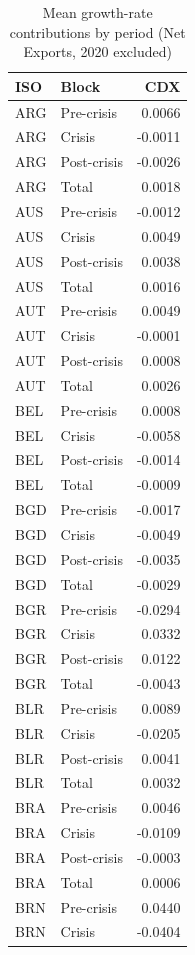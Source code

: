 
\begin{longtable}[t]{llr}
\caption{\label{tab:TAB-PERIOD-MEANS}Mean growth-rate contributions by period (Net Exports, 2020 excluded)}\\
\toprule
ISO & Block & CDX\\
\midrule
ARG & Pre-crisis & 0.0066\\
ARG & Crisis & -0.0011\\
ARG & Post-crisis & -0.0026\\
ARG & Total & 0.0018\\
AUS & Pre-crisis & -0.0012\\
\addlinespace
AUS & Crisis & 0.0049\\
AUS & Post-crisis & 0.0038\\
AUS & Total & 0.0016\\
AUT & Pre-crisis & 0.0049\\
AUT & Crisis & -0.0001\\
\addlinespace
AUT & Post-crisis & 0.0008\\
AUT & Total & 0.0026\\
BEL & Pre-crisis & 0.0008\\
BEL & Crisis & -0.0058\\
BEL & Post-crisis & -0.0014\\
\addlinespace
BEL & Total & -0.0009\\
BGD & Pre-crisis & -0.0017\\
BGD & Crisis & -0.0049\\
BGD & Post-crisis & -0.0035\\
BGD & Total & -0.0029\\
\addlinespace
BGR & Pre-crisis & -0.0294\\
BGR & Crisis & 0.0332\\
BGR & Post-crisis & 0.0122\\
BGR & Total & -0.0043\\
BLR & Pre-crisis & 0.0089\\
\addlinespace
BLR & Crisis & -0.0205\\
BLR & Post-crisis & 0.0041\\
BLR & Total & 0.0032\\
BRA & Pre-crisis & 0.0046\\
BRA & Crisis & -0.0109\\
\addlinespace
BRA & Post-crisis & -0.0003\\
BRA & Total & 0.0006\\
BRN & Pre-crisis & 0.0440\\
BRN & Crisis & -0.0404\\

\end{longtable}
